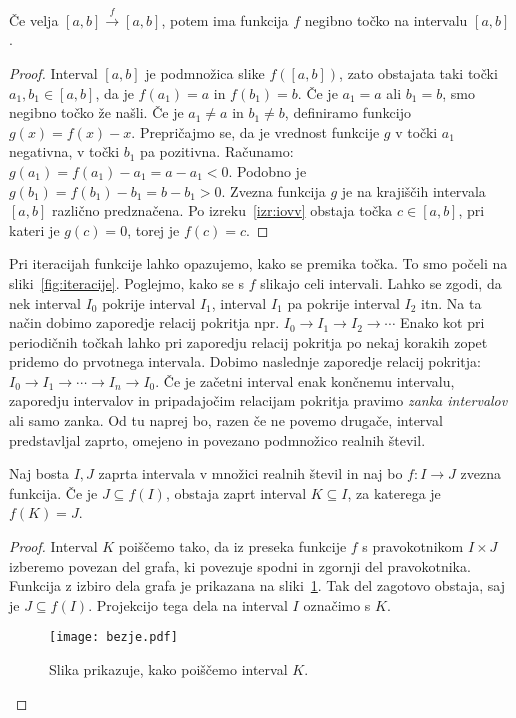 \documentclass[../TG_magistrsko_delo_sections.tex]{subfiles}
\begin{document}
\begin{lema}\label{lem:1zanka}
Če velja $[a, b] \xrightarrow{f} [a, b]$, potem ima funkcija $f$ negibno točko na intervalu $[a, b]$.
\end{lema}
\begin{proof}
Interval $[a, b]$ je podmnožica slike $f([a, b])$, zato obstajata taki točki $a_1, b_1 \in [a, b]$, da je $f(a_1)=a$ in $f(b_1)=b$. Če je $a_1 = a$ ali $b_1 = b$, smo negibno točko že našli. Če je $a_1 \neq a$ in $b_1 \neq b$, definiramo funkcijo $g(x) = f(x) - x$. Prepričajmo se, da je vrednost funkcije $g$ v točki $a_1$ negativna, v točki $b_1$ pa pozitivna. Računamo:
$g(a_1) = f(a_1) - a_1 = a - a_1 < 0$. Podobno je
$g(b_1) = f(b_1) - b_1 = b - b_1 > 0$.
Zvezna funkcija $g$ je na krajiščih intervala $[a, b]$ različno predznačena. Po izreku~\ref{izr:iovv} obstaja točka $c \in [a, b]$, pri kateri je $g(c)=0$, torej je $f(c) = c$.
\end{proof}
Pri iteracijah funkcije lahko opazujemo, kako se premika točka. To smo počeli na sliki~\ref{fig:iteracije}. Poglejmo, kako se s $f$ slikajo celi intervali. Lahko se zgodi, da nek interval $I_0$ pokrije interval $I_1$, interval $I_1$ pa pokrije interval $I_2$ itn. Na ta način dobimo zaporedje relacij pokritja npr. $I_0 \to I_1 \to I_2 \to \cdots $ Enako kot pri periodičnih točkah lahko pri zaporedju relacij pokritja po nekaj korakih zopet pridemo do prvotnega intervala. Dobimo naslednje zaporedje relacij pokritja: $I_0 \to I_1 \to \cdots \to I_n \to I_0$. Če je začetni interval enak končnemu intervalu, zaporedju intervalov in pripadajočim relacijam pokritja pravimo \emph{zanka intervalov} ali samo zanka. Od tu naprej bo, razen če ne povemo drugače, interval predstavljal zaprto, omejeno in povezano podmnožico realnih števil.

\begin{lema}\label{lem:dovetail}
Naj bosta $I, J$ zaprta intervala v množici realnih števil in naj bo $f:I \to J$ zvezna funkcija. Če je $J \subseteq f(I)$, obstaja zaprt interval $K \subseteq I$, za katerega je $f(K) = J$.
\end{lema}
\begin{proof}
Interval $K$ poiščemo tako, da iz preseka funkcije $f$ s pravokotnikom $I \times J$ izberemo povezan del grafa, ki povezuje spodni in zgornji del pravokotnika. Funkcija z izbiro dela grafa je prikazana na sliki~\ref{fig:bezje}. Tak del zagotovo obstaja, saj je $J \subseteq f(I)$. Projekcijo tega dela na interval $I$ označimo s $K$.
\begin{figure}[h]
  \centering
  \texttt{[image: bezje.pdf]}
  \caption[Primer vektorske slike.]{Slika prikazuje, kako poiščemo interval $K$.}
  \label{fig:bezje}
\end{figure}
\end{proof}
\end{document}
